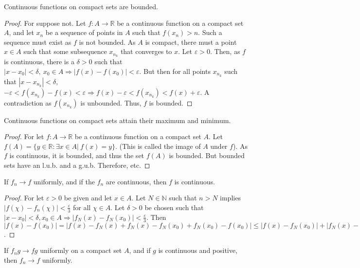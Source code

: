         \begin{theorem}
            Continuous functions on compact sets are bounded.
        \end{theorem}
        \begin{proof}
            For suppose not. Let $f:A\rightarrow \mathbb{R}$ be a continuous function on a compact set $A$, and let $x_n$ be a sequence of points in $A$ such that $f(x_n)>n$. Such a sequence must exist as $f$ is not bounded. As $A$ is compact, there must a point $x\in A$ such that some subsequence $x_{n_k}$ that converges to $x$. Let $\varepsilon >0$. Then, as $f$ is continuous, there is a $\delta>0$ such that $|x-x_0|<\delta,\ x_0\in A\Rightarrow |f(x)-f(x_0)|<\varepsilon$. But then for all points $x_{n_k}$ such that $|x-x_{n_k}|<\delta$, $-\varepsilon<f(x_{n_k})-f(x)<\varepsilon \Rightarrow f(x)-\varepsilon < f(x_{n_k})<f(x)+\varepsilon$. A contradiction as $f(x_{n_k})$ is unbounded. Thus, $f$ is bounded.
        \end{proof}
        \begin{theorem}
            Continuous functions on compact sets attain their maximum and minimum.
        \end{theorem}
        \begin{proof}
            For let $f:A\rightarrow \mathbb{R}$ be a continuous function on a compact set $A$. Let $f(A) = \{y\in \mathbb{R}:\exists x\in A|\ f(x)=y\}$. (This is called the image of $A$ under $f$). As $f$ is continuous, it is bounded, and thus the set $f(A)$ is bounded. But bounded sets have an l.u.b. and a g.u.b. Therefore, etc.
        \end{proof}
        \begin{theorem}
            If $f_n\rightarrow f$ uniformly, and if the $f_n$ are continuous, then $f$ is continuous.
        \end{theorem}
        \begin{proof}
            For let $\varepsilon>0$ be given and let $x\in A$. Let $N\in \mathbb{N}$ such that $n>N$ implies $|f(\chi)-f_n(\chi)|<\frac{\varepsilon}{3}$ for all $\chi\in A$. Let $\delta>0$ be chosen such that $|x-x_0|<\delta, x_0\in A\Rightarrow |f_N(x)-f_N(x_0)|<\frac{\varepsilon}{3}$. Then  $|f(x)-f(x_0)|=|f(x)-f_N(x)+f_N(x)-f_N(x_0)+f_N(x_0)-f(x_0)|\leq |f(x)-f_N(x_0)|+|f_N(x)-f_N(x_0)|+|f(x_0)-f_N(x_0)|<\varepsilon$.
        \end{proof}
        \begin{theorem}
            If $f_ng\rightarrow fg$ uniformly on a compact set $A$, and if $g$ is continuous and positive, then $f_n\rightarrow f$ uniformly.
        \end{theorem}
